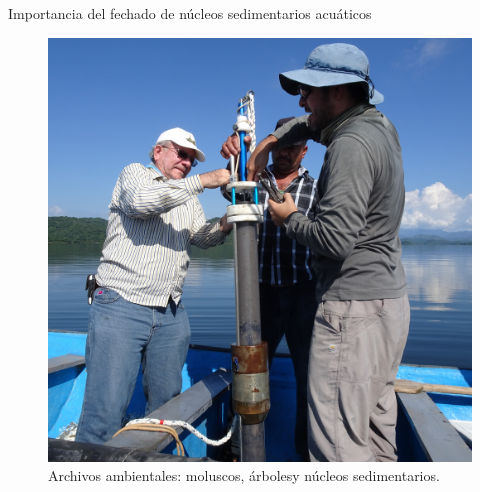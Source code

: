 \documentclass[9pt]{beamer}
\begin{document}
\begin{frame}{Importancia del fechado de núcleos sedimentarios acuáticos}
\begin{figure}
	\includegraphics[height=0.35\textheight]{Imagenes/DSC01875-CUADRADA.JPG}
	\caption{Archivos ambientales: moluscos\footnotemark[2], árboles\footnotemark[3] y núcleos sedimentarios.}
	


\end{figure}

\end{frame}
\end{document}
